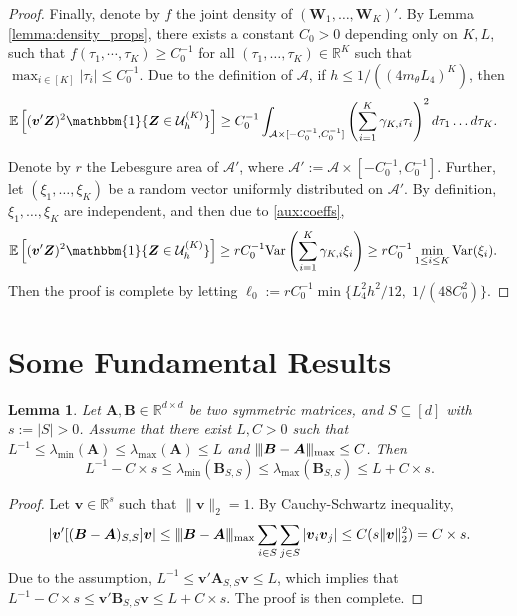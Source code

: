 \documentclass[aos,preprint]{imsart}
\theoremstyle{plain}
\newtheorem{lemma}[theorem]{Lemma}
\theoremstyle{definition}
\newcommand{\bd}[1]{\boldsymbol{#1}}
\newcommand{\idf}{\mathbbm{1}}
\newcommand{\mn}{\vert\kern-0.25ex \vert\kern-0.25ex \vert}
\newcommand{\lmin}[1]{\lambda_{\min}\left(#1\right)}
\newcommand{\lmax}[1]{\lambda_{\max}\left(#1\right)}
\newcommand{\mR}{\mathbb{R}}
\newcommand{\bA}{\boldsymbol{A}}
\newcommand{\bv}{\boldsymbol{v}}
\newcommand{\bZ}{\boldsymbol{Z}}
\newcommand{\bW}{\boldsymbol{W}}
\newcommand{\bR}{\mathbb{R}}
\newcommand{\Exp}{\mathbb{E}}
\begin{document}
\begin{appendix}
\begin{proof}
Finally, denote by $f$ the joint density of $(\bW_1,\ldots,\bW_K)'$. By Lemma \ref{lemma:density_props}, there exists a constant $C_0>0$ depending only on $K,L$, such that 
$f(\tau_1,\cdots,\tau_K)\ge C_0^{-1}$
for all $(\tau_1,\ldots,\tau_K) \in \bR^{K}$ such that $\max_{i\in[K]}|\tau_i|\le C_0^{-1}$. 
Due to the definition of $\mathcal{A}$, if $h \leq 1/\left( (4m_{\theta} L_4)^{K} \right)$, then
\begin{align*}
    &\Exp\left[(\bv'\bZ)^2\idf\{\bZ\in \mathcal{U}_h^{(K)}\}\right] 
    \geq C_0^{-1} \int_{\mathcal{A} \times [-C_0^{-1}, C_0^{-1}]} \left( \sum_{i=1}^{K} \gamma_{K,i} \tau_i\right)^2 d\tau_1\ldots d\tau_K.
\end{align*}

Denote by $r$ the Lebesgure area of $\mathcal{A}'$, where $\mathcal{A}' := \mathcal{A} \times [-C_0^{-1}, C_0^{-1}]$. Further, let $(\xi_1,\ldots,\xi_K)$ be a random vector uniformly distributed on $\mathcal{A}'$. By definition, $\xi_1,\ldots,\xi_K$ are independent, and then due to \eqref{aux:coeffs},
\begin{align*}
    &\Exp\left[(\bv'\bZ)^2\idf\{\bZ\in \mathcal{U}_h^{(K)}\}\right] 
    \geq r C_0^{-1} \text{Var} \left(\sum_{i=1}^{K} \gamma_{K,i} \xi_i\right) \ge rC_0^{-1} \min_{1 \leq i \leq K} \text{Var}(\xi_i).
\end{align*}
Then the proof is complete by letting 
$\ell_0 := r C_0^{-1} \min\{L_4^2 h^2/12, \;1/(48C_0^2)\}$.
\end{proof}


\section{Some Fundamental Results}
\begin{lemma} \label{lemma: subgaussian lower eigenvalue whp}
Let $\bA, \bd{B}\in \mR^{d\times d}$ be two symmetric matrices, and  $S \subseteq [d]$ with $s:=|S| > 0$.  Assume that there exist  $L,C>0$ such that 
$L^{-1}\le \lmin{\bA}\le\lmax{\bA}\le L$ and $\mn\bd{B}-\bA\mn_{\textup{max}}\le C$.
Then 
$$
L^{-1}-C\times s\le \lmin{\bd{B}_{S,S}} \le \lmax{\bd{B}_{S,S}}\le L+C \times s.
$$
\end{lemma}

\begin{proof}
Let $\bv \in \bR^{s}$ such that $\|\bv\|_2 = 1$. By Cauchy-Schwartz inequality,
\begin{align*}
    \left|\bv'[(\bd{B}-\bA)_{S,S}] \bv\right| \le \mn\bd{B}-\bA\mn_{\textup{max}}\sum_{i\in S}\sum_{j\in S}|\bv_i\bv_j| \le C (s\|\bv\|_2^2) = C \times s.
\end{align*}
Due to the assumption,  $L^{-1}\le \bv' \bA_{S,S} \bv \le L$, which implies that $L^{-1} - C \times s\le \bv' \bd{B}_{S,S} \bv \le L + C \times s$. The proof is then complete.
\end{proof}


\end{appendix}
\end{document}
